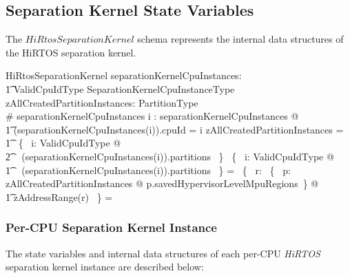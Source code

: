 \documentclass[11pt,letterpaper,twoside,openany]{book}
\begin{document}
\subsection{Separation Kernel State Variables}

The $HiRtosSeparationKernel$ schema represents the internal data
structures of the HiRTOS separation kernel.

\begin{schema}{HiRtosSeparationKernel}
    separationKernelCpuInstances: \\
    \t1 ValidCpuIdType \finj SeparationKernelCpuInstanceType \\
    zAllCreatedPartitionInstances: \finset PartitionType \\
\where
    \# separationKernelCpuInstances 
\also
    \forall i : \dom separationKernelCpuInstances @ \\
\t1   (separationKernelCpuInstances(i)).cpuId = i
\also
    zAllCreatedPartitionInstances = \\
\t1    \bigcup~\{~ i: ValidCpuIdType @ \\
\t2    \ran~ (separationKernelCpuInstances(i)).partitions ~\}
\also
    \bigcap~\{~ i: ValidCpuIdType @ \\
\t1    \ran~ (separationKernelCpuInstances(i)).partitions ~\} = \emptyset
\also
    \bigcap~\{~ r: \bigcup~\{~ p: zAllCreatedPartitionInstances @ p.savedHypervisorLevelMpuRegions~\} @ \\
    \t1 zAddressRange(r) ~\} = \emptyset
\end{schema}

\subsubsection{Per-CPU Separation Kernel Instance}

The state variables and internal data structures of each per-CPU \emph{HiRTOS} separation kernel instance
are described below:
\end{document}
